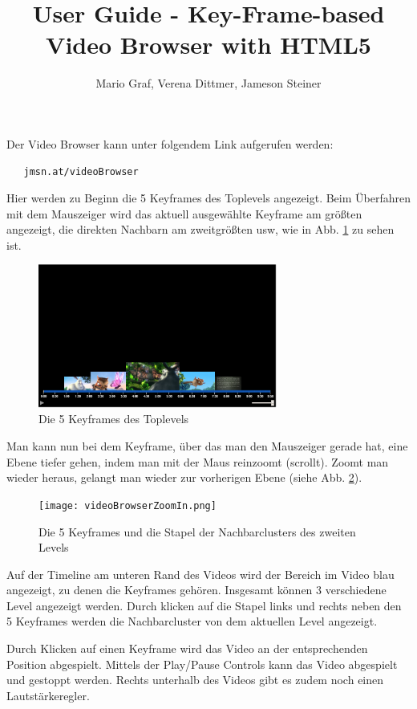 \documentclass[a4paper,11pt,german]{scrartcl}
\title{User Guide - Key-Frame-based Video Browser with HTML5}
\author{Mario Graf, Verena Dittmer, Jameson Steiner}
\begin{document}
\maketitle

Der Video Browser kann unter folgendem Link aufgerufen werden:
\begin{lstlisting}
   jmsn.at/videoBrowser
\end{lstlisting}
Hier werden zu Beginn die 5 Keyframes des Toplevels angezeigt. 
Beim Überfahren mit dem Mauszeiger wird das aktuell ausgewählte Keyframe am größten angezeigt, die direkten Nachbarn am zweitgrößten usw, wie in Abb. \ref{beginning} zu sehen ist.

\begin{figure}[ht!]
	\centering
  	\includegraphics[width=0.7\textwidth]{videoBrowserBeginning.png}
	\caption{Die 5 Keyframes des Toplevels}
	\label{beginning}
\end{figure}

Man kann nun bei dem Keyframe, über das man den Mauszeiger gerade hat, eine Ebene tiefer gehen, indem man mit der Maus reinzoomt (scrollt). Zoomt man wieder heraus, gelangt man wieder zur vorherigen Ebene (siehe Abb. \ref{zoomedIn}). 

\begin{figure}[ht!]
	\centering
  	\texttt{[image: videoBrowserZoomIn.png]}
	\caption{Die 5 Keyframes und die Stapel der Nachbarclusters des zweiten Levels}
	\label{zoomedIn}
\end{figure}

Auf der Timeline am unteren Rand des Videos wird der Bereich im Video blau angezeigt, zu denen die Keyframes gehören. Insgesamt können 3 verschiedene Level angezeigt werden. Durch klicken auf die Stapel links und rechts neben den 5 Keyframes werden die Nachbarcluster von dem aktuellen Level angezeigt. 

Durch Klicken auf einen Keyframe wird das Video an der entsprechenden Position abgespielt. Mittels der Play/Pause Controls kann das Video abgespielt und gestoppt werden. Rechts unterhalb des Videos gibt es zudem noch einen Lautstärkeregler.
\end{document}
